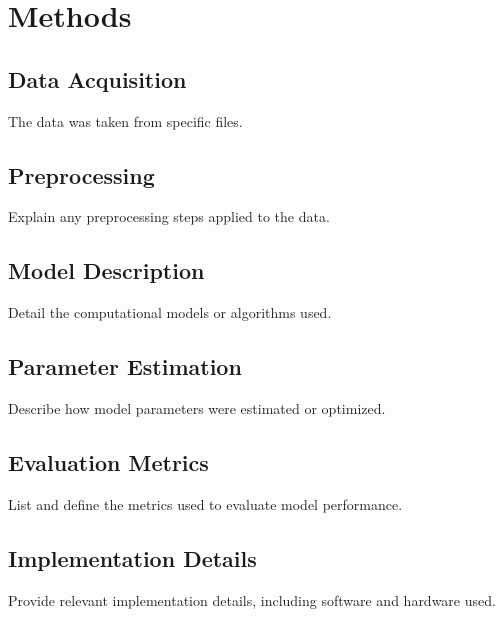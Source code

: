 \section{Methods}
\label{sec:methods}

\subsection{Data Acquisition}
The data was taken from specific files.

\subsection{Preprocessing}
Explain any preprocessing steps applied to the data.

\subsection{Model Description}
Detail the computational models or algorithms used.

\subsection{Parameter Estimation}
Describe how model parameters were estimated or optimized.

\subsection{Evaluation Metrics}
List and define the metrics used to evaluate model performance.

\subsection{Implementation Details}
Provide relevant implementation details, including software and hardware used.